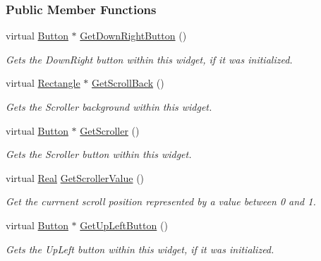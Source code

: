 \subsubsection*{Public Member Functions}
\begin{DoxyCompactItemize}
\item 
virtual \hyperlink{classMezzanine_1_1UI_1_1Button}{Button} $\ast$ \hyperlink{classMezzanine_1_1UI_1_1Scrollbar_a3bd3766aaa1fc8d5fa783b18de2061b7}{GetDownRightButton} ()
\begin{DoxyCompactList}\small\item\em Gets the DownRight button within this widget, if it was initialized. \item\end{DoxyCompactList}\item 
virtual \hyperlink{classMezzanine_1_1UI_1_1Rectangle}{Rectangle} $\ast$ \hyperlink{classMezzanine_1_1UI_1_1Scrollbar_ae5baca9bf557124425ee063cc0d5afc9}{GetScrollBack} ()
\begin{DoxyCompactList}\small\item\em Gets the Scroller background within this widget. \item\end{DoxyCompactList}\item 
virtual \hyperlink{classMezzanine_1_1UI_1_1Button}{Button} $\ast$ \hyperlink{classMezzanine_1_1UI_1_1Scrollbar_a959c0d66d71998f7a7bde333605f034a}{GetScroller} ()
\begin{DoxyCompactList}\small\item\em Gets the Scroller button within this widget. \item\end{DoxyCompactList}\item 
virtual \hyperlink{namespaceMezzanine_a726731b1a7df72bf3583e4a97282c6f6}{Real} \hyperlink{classMezzanine_1_1UI_1_1Scrollbar_a418afe88c4b88759e7c7ddd5ca7cd8ab}{GetScrollerValue} ()
\begin{DoxyCompactList}\small\item\em Get the currnent scroll position represented by a value between 0 and 1. \item\end{DoxyCompactList}\item 
virtual \hyperlink{classMezzanine_1_1UI_1_1Button}{Button} $\ast$ \hyperlink{classMezzanine_1_1UI_1_1Scrollbar_a269c72f430babb108dbce17b0918dc93}{GetUpLeftButton} ()
\begin{DoxyCompactList}\small\item\em Gets the UpLeft button within this widget, if it was initialized. \item\end{DoxyCompactList}\item 

\end{DoxyCompactItemize}
